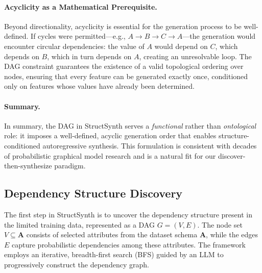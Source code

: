 \paragraph{Acyclicity as a Mathematical Prerequisite.}
Beyond directionality, acyclicity is essential for the generation process to be well-defined. If cycles were permitted---e.g., $A \to B \to C \to A$---the generation would encounter circular dependencies: the value of $A$ would depend on $C$, which depends on $B$, which in turn depends on $A$, creating an unresolvable loop. The DAG constraint guarantees the existence of a valid topological ordering over nodes, ensuring that every feature can be generated exactly once, conditioned only on features whose values have already been determined.

\paragraph{Summary.}
In summary, the DAG in \textsf{StructSynth} serves a \emph{functional} rather than \emph{ontological} role: it imposes a well-defined, acyclic generation order that enables structure-conditioned autoregressive synthesis. This formulation is consistent with decades of probabilistic graphical model research and is a natural fit for our discover-then-synthesize paradigm.


\subsection{Dependency Structure Discovery}

The first step in \textsf{StructSynth} is to uncover the dependency structure present in the limited training data, represented as a DAG $G = (V, E)$. The node set $V \subseteq \mathbf{A}$ consists of selected attributes from the dataset schema $\mathbf{A}$, while the edges $E$ capture probabilistic dependencies among these attributes. The framework employs an iterative, breadth-first search (BFS) guided by an LLM to progressively construct the dependency graph.

